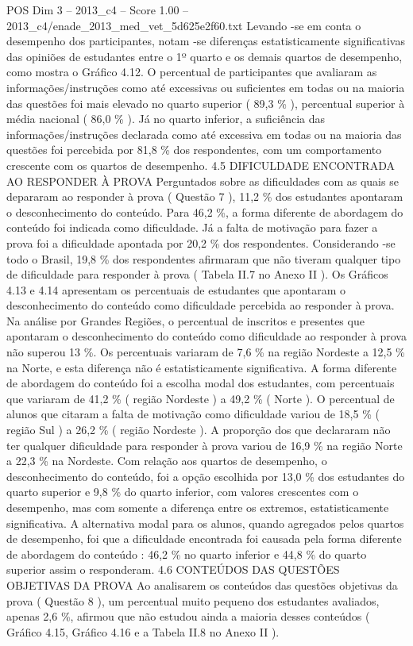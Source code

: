 \begin{textsample}{POS Dim 3 – 2013\_c4 – Score 1.00 – 2013\_c4/enade\_2013\_med\_vet\_5d625e2f60.txt}
Levando -se em conta o desempenho dos participantes, notam -se diferenças estatisticamente significativas das opiniões de estudantes entre o 1º quarto e os demais quartos de desempenho, como mostra o Gráfico 4.12.
O percentual de participantes que avaliaram as informações/instruções como até excessivas ou suficientes em todas ou na maioria das questões foi mais elevado no quarto superior ( 89,3 \% ), percentual superior à média nacional ( 86,0 \% ).
Já no quarto inferior, a suficiência das informações/instruções declarada como até excessiva em todas ou na maioria das questões foi percebida por 81,8 \% dos respondentes, com um comportamento crescente com os quartos de desempenho. 4.5 DIFICULDADE ENCONTRADA AO RESPONDER À PROVA Perguntados sobre as dificuldades com as quais se depararam ao responder à prova ( Questão 7 ), 11,2 \% dos estudantes apontaram o desconhecimento do conteúdo.
Para 46,2 \%, a forma diferente de abordagem do conteúdo foi indicada como dificuldade.
Já a falta de motivação para fazer a prova foi a dificuldade apontada por 20,2 \% dos respondentes.
Considerando -se todo o Brasil, 19,8 \% dos respondentes afirmaram que não tiveram qualquer tipo de dificuldade para responder à prova ( Tabela II.7 no Anexo II ).
Os Gráficos 4.13 e 4.14 apresentam os percentuais de estudantes que apontaram o desconhecimento do conteúdo como dificuldade percebida ao responder à prova.
Na análise por Grandes Regiões, o percentual de inscritos e presentes que apontaram o desconhecimento do conteúdo como dificuldade ao responder à prova não superou 13 \%.
Os percentuais variaram de 7,6 \% na região Nordeste a 12,5 \% na Norte, e esta diferença não é estatisticamente significativa.
A forma diferente de abordagem do conteúdo foi a escolha modal dos estudantes, com percentuais que variaram de 41,2 \% ( região Nordeste ) a 49,2 \% ( Norte ).
O percentual de alunos que citaram a falta de motivação como dificuldade variou de 18,5 \% ( região Sul ) a 26,2 \% ( região Nordeste ).
A proporção dos que declararam não ter qualquer dificuldade para responder à prova variou de 16,9 \% na região Norte a 22,3 \% na Nordeste.
Com relação aos quartos de desempenho, o desconhecimento do conteúdo, foi a opção escolhida por 13,0 \% dos estudantes do quarto superior e 9,8 \% do quarto inferior, com valores crescentes com o desempenho, mas com somente a diferença entre os extremos, estatisticamente significativa.
A alternativa modal para os alunos, quando agregados pelos quartos de desempenho, foi que a dificuldade encontrada foi causada pela forma diferente de abordagem do conteúdo : 46,2 \% no quarto inferior e 44,8 \% do quarto superior assim o responderam. 4.6 CONTEÚDOS DAS QUESTÕES OBJETIVAS DA PROVA Ao analisarem os conteúdos das questões objetivas da prova ( Questão 8 ), um percentual muito pequeno dos estudantes avaliados, apenas 2,6 \%, afirmou que não estudou ainda a maioria desses conteúdos ( Gráfico 4.15, Gráfico 4.16 e a Tabela II.8 no Anexo II ).

\end{textsample}
